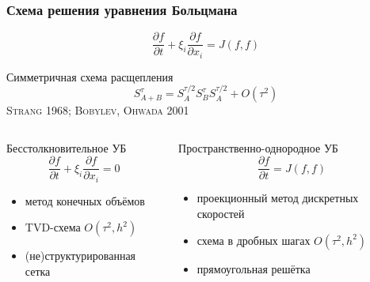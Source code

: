 \documentclass[mathserif]{beamer} %
\newcommand{\pder}[2][]{\frac{\partial#1}{\partial#2}}
\newcommand{\OO}[1]{O(#1)}
\newcommand{\Cite}[2][]{\alert{\textsc{#2 #1}}}
\begin{document}
\begin{frame}
    \frametitle{Схема решения уравнения Больцмана}
    \vspace{-5pt}
    \[ \pder[f]{t} + \xi_i\pder[f]{x_i} = J(f,f) \]
    \vspace{-10pt}
    \begin{block}{Симметричная схема расщепления}
        \[ S_{A+B}^{\tau} = S_A^{\tau/2}S_B^{\tau}S_A^{\tau/2} + \OO{\tau^2} \]
        \centering \Cite[1968]{Strang}; \Cite[2001]{Bobylev, Ohwada}
    \end{block}
    \vspace{-10pt}
    \begin{columns}[T]
        \begin{column}{5cm}
            \begin{block}{Бесстолкновительное УБ}
                \[ \pder[f]{t} + \xi_i\pder[f]{x_i} = 0 \]
                \vspace{-15pt}
                \begin{itemize}
                    \item метод конечных объёмов
                    \item TVD-схема \(\OO{\tau^2, h^2}\)
                    \item (не)структурированная сетка
                \end{itemize}
            \end{block}
        \end{column}
        \begin{column}{6.5cm}
            \begin{block}{Пространственно-однородное УБ}
                \[ \pder[f]{t} = J(f,f) \]
                \vspace{-15pt}
                \begin{itemize}
                    \item проекционный метод дискретных скоростей
                    \item схема в дробных шагах \(\OO{\tau^2, h^2}\)
                    \item прямоугольная решётка
                \end{itemize}
            \end{block}
        \end{column}
    \end{columns}
\end{frame}
\end{document}
